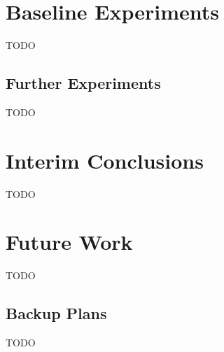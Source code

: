 \documentclass{article}
\begin{document}
\section{Baseline Experiments}
\label{sec:baseline}

TODO

\subsection{Further Experiments}
\label{sec:further}

TODO

\section{Interim Conclusions}
\label{sec:conclusions}

TODO

\section{Future Work}
\label{sec:future}

TODO

\subsection{Backup Plans}
\label{sec:plans}

TODO



\end{document}
